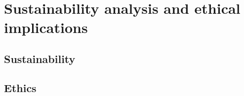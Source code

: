 \section{Sustainability analysis and ethical implications}

\subsection{Sustainability}

\subsection{Ethics}